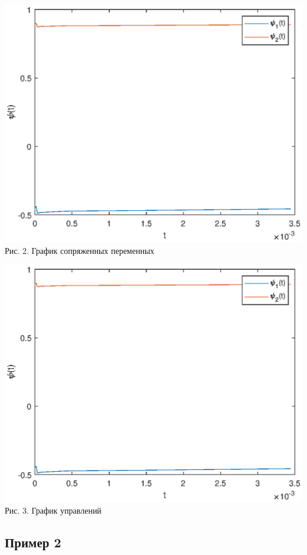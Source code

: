 \documentclass{article}
\theoremstyle{definition}
\begin{document}
\begin{center}
  {\includegraphics[width=15cm]{pexample1.eps}}
{Рис. 2. График сопряженных переменных}
\end{center}

\begin{center}
  {\includegraphics[width=15cm]{uexample1.eps}}
{Рис. 3. График управлений}
\end{center}

\newpage

\subsection{Пример 2}
\end{document}
